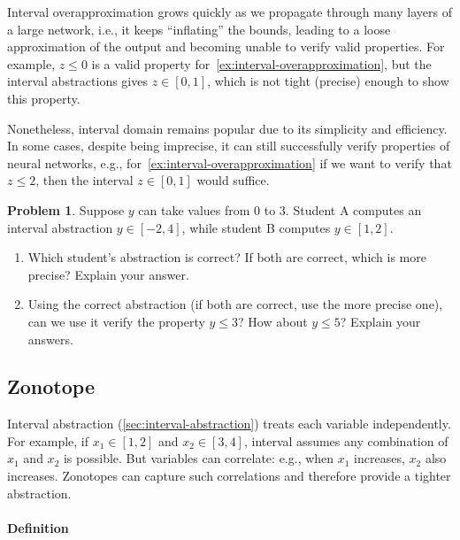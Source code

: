 \documentclass[oneside,11pt,dvipsnames]{book}
\numberwithin{equation}{section}
\theoremstyle{definition}
\newtheorem{problem}{Problem}[section]
\theoremstyle{remark}
\newcommand{\tvn}[1]{\iftoggle{usecomment}{{\color{red}{[TVN]: #1}}}{}}
\begin{document}
Interval overapproximation grows quickly as we propagate through many layers of a large network, i.e., it keeps ``inflating'' the bounds, leading to a loose approximation of the output and becoming unable to verify valid properties.  For example, $z \leq 0$ is a valid property for~\autoref{ex:interval-overapproximation}, but the interval abstractions gives $z \in [0,1]$, which is not tight (precise) enough to show this property.

Nonetheless, interval domain remains popular due to its simplicity and efficiency. In some cases, despite being imprecise, it can still successfully verify properties of neural networks, e.g., for~\autoref{ex:interval-overapproximation} if we want to verify that $z \le 2$, then the interval $z\in [0, 1]$ would suffice.

\begin{problem}\label{prob:correct-abs}
    Suppose $y$ can take values from 0 to 3. Student A computes an interval abstraction $y \in [-2,4]$, while student B computes $y \in [1,2]$.
    \begin{enumerate}
        \item Which student's abstraction is correct?  If both are correct, which is more precise? Explain your answer.
        \item Using the correct abstraction (if both are correct, use the more precise one), can we use it verify the property $y \leq 3$? How about $y \le 5$? Explain your answers.
    \end{enumerate}
\end{problem}
\subsection{Zonotope}\label{sec:zonotope-abstraction}


Interval abstraction (\autoref{sec:interval-abstraction}) treats each variable independently. For example, if \(x_1 \in [1,2]\) and \(x_2 \in [3,4]\), interval assumes any combination of \(x_1\) and \(x_2\) is possible. But variables can correlate: e.g., when \(x_1\) increases, \(x_2\) also increases\tvn{but this doesn't happens in neural networks, so why do we need zonotope? does it help with ReLU abstraction?}.  Zonotopes can capture such correlations and therefore  provide a tighter abstraction.



\paragraph{Definition}
\end{document}
